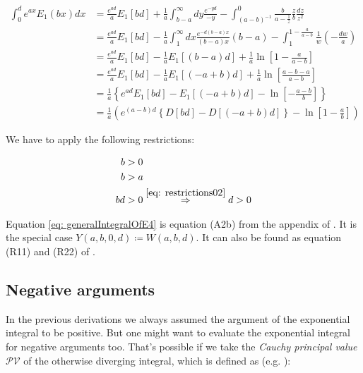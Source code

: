 \documentclass[bibliography=totocnumbered]{scrartcl}
\begin{document}
	\begin{align}
		\int_{0}^{d}e^{ax}E_1\left(bx\right)dx&=\frac{e^{ad}}{a}E_1\left[bd\right]+\frac{1}{a}\int_{b-a}^{\infty}dy\frac{e^{-yd}}{-y}-\int_{\left(a-b\right)^{-1}}^{0}\frac{b}{a-\frac{1}{z}}\frac{z}{b}\frac{dz}{z^2}\\
		&=\frac{e^{ad}}{a}E_1\left[bd\right]-\frac{1}{a}\int_{1}^{\infty}dx\frac{e^{-d\left(b-a\right)x}}{\left(b-a\right)x}\left(b-a\right)-\int_{1}^{1-\frac{a}{a-b}}\frac{1}{w}\left(-\frac{dw}{a}\right)\\
		&=\frac{e^{ad}}{a}E_1\left[bd\right]-\frac{1}{a}E_1\left[\left(b-a\right)d\right]+\frac{1}{a}\ln{\left[1-\frac{a}{a-b}\right]}\\
		&=\frac{e^{ad}}{a}E_1\left[bd\right]-\frac{1}{a}E_1\left[\left(-a+b\right)d\right]+\frac{1}{a}\ln{\left[\frac{a-b-a}{a-b}\right]}\\
		&=\frac{1}{a}\left\{e^{ad}E_1\left[bd\right]-E_1\left[\left(-a+b\right)d\right]-\ln{\left[-\frac{a-b}{b}\right]}\right\}\\
		&=\frac{1}{a}\left(e^{\left(a-b\right)d}\left\{D\left[bd\right]-D\left[\left(-a+b\right)d\right]\right\}-\ln{\left[1-\frac{a}{b}\right]}\right)\label{eq: generalIntegralOfE4}
	\end{align}

	We have to apply the following restrictions:

	\begin{subequations}
		\begin{align}
			b&>0\label{eq: restrictions01}\\
			b&>a\label{eq: restrictions02}\\
			bd&>0\overset{\eqref{eq: restrictions02}}{\Rightarrow}d>0
		\end{align}
	\end{subequations}

	Equation \eqref{eq: generalIntegralOfE4} is equation (A2b) from the appendix of \cite{boer1990calc}. It is the special case $Y\left(a,b,0,d\right)\coloneqq{}W\left(a,b,d\right)$. It can also be found as equation (R11) and (R22) of \cite{sherman}.

	\subsection{Negative arguments}

	In the previous derivations we always assumed the argument of the exponential integral to be positive. But one might want to evaluate the exponential integral for negative arguments too. That's possible if we take the \emph{Cauchy principal value} $\mathcal{PV}$ of the otherwise diverging integral, which is defined as (e.g. \cite{bronstein}):
\end{document}
